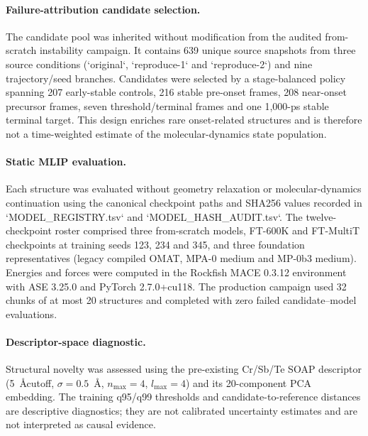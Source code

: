 \paragraph{Failure-attribution candidate selection.}
The candidate pool was inherited without modification from the audited from-scratch instability campaign. It contains 639 unique source snapshots from three source conditions (`original`, `reproduce-1` and `reproduce-2`) and nine trajectory/seed branches. Candidates were selected by a stage-balanced policy spanning 207 early-stable controls, 216 stable pre-onset frames, 208 near-onset precursor frames, seven threshold/terminal frames and one 1,000-ps stable terminal target. This design enriches rare onset-related structures and is therefore not a time-weighted estimate of the molecular-dynamics state population.

\paragraph{Static MLIP evaluation.}
Each structure was evaluated without geometry relaxation or molecular-dynamics continuation using the canonical checkpoint paths and SHA256 values recorded in `MODEL_REGISTRY.tsv` and `MODEL_HASH_AUDIT.tsv`. The twelve-checkpoint roster comprised three from-scratch models, FT-600K and FT-MultiT checkpoints at training seeds 123, 234 and 345, and three foundation representatives (legacy compiled OMAT, MPA-0 medium and MP-0b3 medium). Energies and forces were computed in the Rockfish MACE 0.3.12 environment with ASE 3.25.0 and PyTorch 2.7.0+cu118. The production campaign used 32 chunks of at most 20 structures and completed with zero failed candidate--model evaluations.

\paragraph{Descriptor-space diagnostic.}
Structural novelty was assessed using the pre-existing Cr/Sb/Te SOAP descriptor (5~\AA cutoff, $\sigma=0.5$~\AA, $n_\mathrm{max}=4$, $l_\mathrm{max}=4$) and its 20-component PCA embedding. The training q95/q99 thresholds and candidate-to-reference distances are descriptive diagnostics; they are not calibrated uncertainty estimates and are not interpreted as causal evidence.
